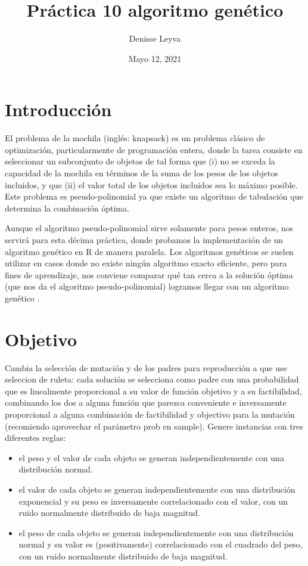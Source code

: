 \documentclass{article}
\title{Práctica 10 algoritmo genético}
\author{Denisse Leyva}
\date{Mayo 12, 2021}
\begin{document}
\maketitle


\section{Introducción}
El problema de la mochila (inglés: knapsack) es un problema clásico de optimización, particularmente de programación entera, donde la tarea consiste en seleccionar un subconjunto de objetos de tal forma que (i) no se exceda la capacidad de la mochila en términos de la suma de los pesos de los objetos incluidos, y que (ii) el valor total de los objetos incluidos sea lo máximo posible. Este problema es pseudo-polinomial ya que existe un algoritmo de tabulación que determina la combinación óptima.

Aunque el algoritmo pseudo-polinomial sirve solamente para pesos enteros, nos servirá para esta décima práctica, donde probamos la implementación de un algoritmo genético en R de manera paralela. Los algoritmos genéticos se suelen utilizar en casos donde no existe ningún algoritmo exacto eficiente, pero para fines de aprendizaje, nos conviene comparar qué tan cerca a la solución óptima (que nos da el algoritmo pseudo-polinomial) logramos llegar con un algoritmo genético \cite{Satu_Elisa_Schaeffer}.

\section{Objetivo}
Cambia la selección de mutación y de los padres para reproducción a que use seleccion de ruleta: cada solución se selecciona como padre con una probabilidad que es linealmente proporcional a su valor de función objetivo y a su factibilidad, combinando los dos a alguna función que parezca conveniente e inversamente proporcional a alguna combinación de factibilidad y objectivo para la mutación (recomiendo aprovechar el parámetro prob en sample).
Genere instancias con tres diferentes reglas:
\begin{itemize}
  \item el peso y el valor de cada objeto se generan independientemente con una distribución normal.
  \item el valor de cada objeto se generan independientemente con una distribución exponencial y su peso es inversamente correlacionado con el valor, con un ruido normalmente distribuido de baja magnitud.
  \item el peso de cada objeto se generan independientemente con una distribución normal y su valor es (positivamente) correlacionado con el cuadrado del peso, con un ruido normalmente distribuido de baja magnitud.
\end{itemize}
\end{document}
